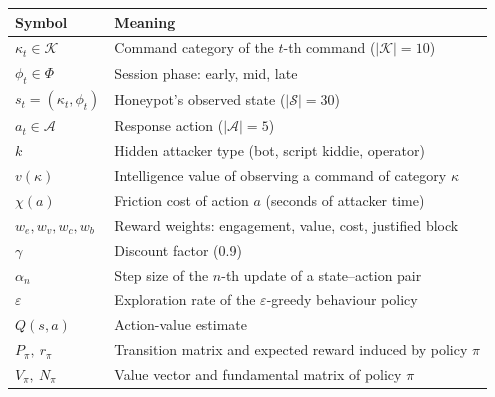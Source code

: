 \vspace{1.2em}
\begin{tabular}{@{}p{3.2cm}p{10cm}@{}}
\toprule
\textbf{Symbol} & \textbf{Meaning} \\
\midrule
$\kappa_t \in \mathcal{K}$ & Command category of the $t$-th command ($|\mathcal{K}| = 10$) \\
$\phi_t \in \Phi$ & Session phase: early, mid, late \\
$s_t = (\kappa_t,\phi_t)$ & Honeypot's observed state ($|\mathcal{S}| = 30$) \\
$a_t \in \mathcal{A}$ & Response action ($|\mathcal{A}| = 5$) \\
$k$ & Hidden attacker type (bot, script kiddie, operator) \\
$v(\kappa)$ & Intelligence value of observing a command of category $\kappa$ \\
$\chi(a)$ & Friction cost of action $a$ (seconds of attacker time) \\
$w_e, w_v, w_c, w_b$ & Reward weights: engagement, value, cost, justified block \\
$\gamma$ & Discount factor (0.9) \\
$\alpha_n$ & Step size of the $n$-th update of a state--action pair \\
$\varepsilon$ & Exploration rate of the $\varepsilon$-greedy behaviour policy \\
$Q(s,a)$ & Action-value estimate \\
$P_\pi,\ r_\pi$ & Transition matrix and expected reward induced by policy $\pi$ \\
$V_\pi,\ N_\pi$ & Value vector and fundamental matrix of policy $\pi$ \\
\bottomrule
\end{tabular}

